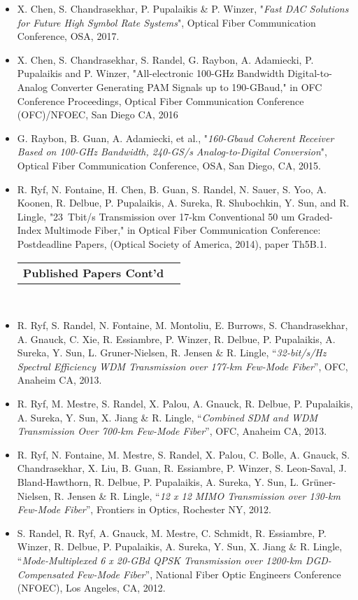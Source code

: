 \documentclass[10pt,letterpaper]{extarticle}
\makeatletter
\newenvironment{indentsection}[1]%
{\begin{list}{}%
	{\setlength{\leftmargin}{#1}}%
	\item[]%
}
{\end{list}}
\newcommand{\headerrow}[2]
{\begin{tabular*}{\linewidth}{l@{\extracolsep{\fill}}r}
	#1 &
	#2 \\
\end{tabular*}}
\makeatother
\begin{document}
\begin{indentsection}{-1em}\begin{itemize}
\parskip=-0.2em
\item X. Chen, S. Chandrasekhar, P. Pupalaikis \& P. Winzer, "\emph{Fast DAC Solutions for Future High Symbol Rate Systems}", Optical Fiber Communication Conference, OSA, 2017.
\item X. Chen, S. Chandrasekhar, S. Randel, G. Raybon, A. Adamiecki, P. Pupalaikis and P. Winzer, "All-electronic 100-GHz Bandwidth Digital-to-Analog Converter Generating PAM Signals up to 190-GBaud," in OFC Conference Proceedings, Optical Fiber Communication Conference (OFC)/NFOEC, San Diego CA, 2016
\item G. Raybon, B. Guan, A. Adamiecki, et al., "\emph{160-Gbaud Coherent Receiver Based on 100-GHz Bandwidth, 240-GS/s Analog-to-Digital Conversion}",  Optical Fiber Communication Conference, OSA, San Diego, CA, 2015.
\item R. Ryf, N. Fontaine, H. Chen, B. Guan, S. Randel, N. Sauer, S. Yoo, A. Koonen, R. Delbue, P. Pupalaikis, A. Sureka, R. Shubochkin, Y. Sun, and R. Lingle, "23~Tbit/s Transmission over 17-km Conventional 50 um Graded-Index Multimode Fiber," in Optical Fiber Communication Conference: Postdeadline Papers,  (Optical Society of America, 2014), paper Th5B.1.
\clearpage
\headerrow
	{\large \textbf{Published Papers Cont'd}}
	{}\\
\item R. Ryf, S. Randel, N. Fontaine, M. Montoliu, E. Burrows, S. Chandrasekhar, A. Gnauck, C. Xie, R. Essiambre, P. Winzer, R. Delbue, P. Pupalaikis, A. Sureka, Y. Sun, L. Gruner-Nielsen, R. Jensen \& R. Lingle, “\emph{32-bit/s/Hz Spectral Efficiency WDM Transmission over 177-km Few-Mode Fiber}”, OFC, Anaheim CA, 2013.
\item R. Ryf, M. Mestre, S. Randel, X. Palou, A. Gnauck, R. Delbue, P. Pupalaikis, A. Sureka, Y. Sun, X. Jiang \& R. Lingle, “\emph{Combined SDM and WDM Transmission Over 700-km Few-Mode Fiber}”, OFC, Anaheim CA, 2013.
\item R. Ryf, N. Fontaine, M. Mestre, S. Randel, X. Palou, C. Bolle, A. Gnauck, S. Chandrasekhar, X. Liu, B. Guan, R. Essiambre, P. Winzer, S. Leon-Saval, J. Bland-Hawthorn, R. Delbue, P. Pupalaikis, A. Sureka, Y. Sun, L. Grüner-Nielsen, R. Jensen \& R. Lingle, “\emph{12 x 12 MIMO Transmission over 130-km Few-Mode Fiber}”, Frontiers in Optics, Rochester NY, 2012.
\item S. Randel, R. Ryf, A. Gnauck, M. Mestre, C. Schmidt, R. Essiambre, P. Winzer, R. Delbue, P. Pupalaikis, A. Sureka, Y. Sun, X. Jiang \& R. Lingle, “\emph{Mode-Multiplexed 6 x 20-GBd QPSK Transmission over 1200-km DGD-Compensated Few-Mode Fiber}”, National Fiber Optic Engineers Conference (NFOEC), Los Angeles, CA, 2012.

\end{itemize}
\end{indentsection}
\end{document}
